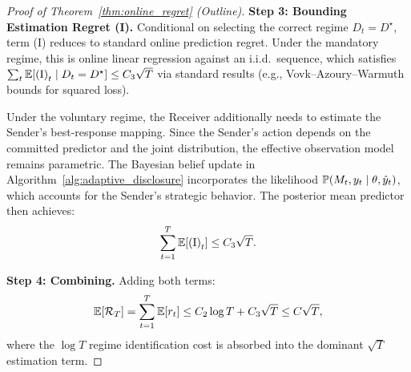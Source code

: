 \begin{proof}[Proof of Theorem~\ref{thm:online_regret} (Outline)]
\textbf{Step 3: Bounding Estimation Regret (I).}
Conditional on selecting the correct regime $D_t = D^\star$, term (I) reduces to standard online prediction regret. Under the mandatory regime, this is online linear regression against an i.i.d.\ sequence, which satisfies $\sum_t \mathbb{E}[\text{(I)}_t \mid D_t = D^\star] \le C_3 \sqrt{T}$ via standard results (e.g., Vovk--Azoury--Warmuth bounds for squared loss).

Under the voluntary regime, the Receiver additionally needs to estimate the Sender's best-response mapping. Since the Sender's action depends on the committed predictor and the joint distribution, the effective observation model remains parametric. The Bayesian belief update in Algorithm~\ref{alg:adaptive_disclosure} incorporates the likelihood $\mathbb{P}(M_t, y_t \mid \theta, \hat{y}_t)$, which accounts for the Sender's strategic behavior. The posterior mean predictor then achieves:
\begin{equation*}
  \sum_{t=1}^T \mathbb{E}[\text{(I)}_t] \le C_3 \sqrt{T}.
\end{equation*}

\textbf{Step 4: Combining.}
Adding both terms:
\begin{equation*}
  \mathbb{E}[\mathcal{R}_T] = \sum_{t=1}^T \mathbb{E}[r_t] \le C_2 \log T + C_3 \sqrt{T} \le C\sqrt{T},
\end{equation*}
where the $\log T$ regime identification cost is absorbed into the dominant $\sqrt{T}$ estimation term.
\end{proof}
